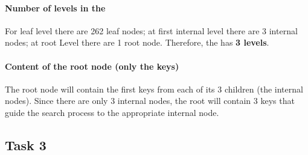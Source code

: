 \paragraph{Number of levels in the \bplustree} For leaf level there are 262 leaf nodes; at first internal level there are 3 internal nodes; at root Level there are 1 root node. Therefore, the \bplustree has \textbf{3 levels}.

\paragraph{Content of the root node (only the keys)} The root node will contain the first keys from each of its 3 children (the internal nodes). Since there are only 3 internal nodes, the root will contain 3 keys that guide the search process to the appropriate internal node.

\subsection{Task 3}
\label{subsec:task-3}

